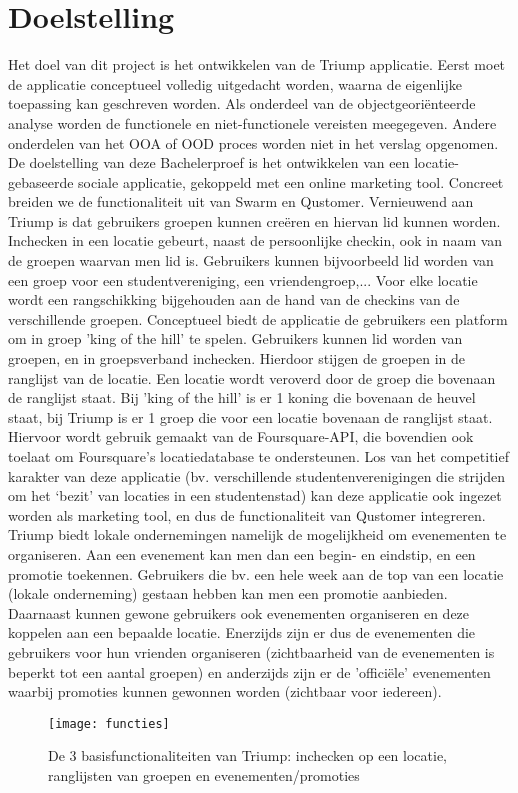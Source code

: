 
\chapter{Doelstelling}

Het doel van dit project is het ontwikkelen van de Triump applicatie. Eerst moet de applicatie conceptueel volledig uitgedacht worden, waarna de eigenlijke toepassing kan geschreven worden. Als onderdeel van de objectgeoriënteerde analyse worden de functionele en niet-functionele vereisten meegegeven. Andere onderdelen van het OOA of OOD proces worden niet in het verslag opgenomen.
De doelstelling van deze Bachelerproef is het ontwikkelen van een locatie-gebaseerde sociale applicatie, gekoppeld met een online marketing tool. Concreet breiden we de functionaliteit uit van Swarm en Qustomer. Vernieuwend aan Triump is dat gebruikers groepen kunnen creëren en hiervan lid kunnen worden. Inchecken in een locatie gebeurt, naast de persoonlijke checkin, ook in naam van de groepen waarvan men lid is. Gebruikers kunnen bijvoorbeeld lid worden van een groep voor een studentvereniging, een vriendengroep,...
Voor elke locatie wordt een rangschikking bijgehouden aan de hand van de checkins van de verschillende groepen. Conceptueel biedt de applicatie de gebruikers een platform om in groep 'king of the hill' te spelen. Gebruikers kunnen lid worden van groepen, en in groepsverband inchecken. Hierdoor stijgen de groepen in de ranglijst van de locatie. Een locatie wordt veroverd door de groep die bovenaan de ranglijst staat.
Bij 'king of the hill' is er 1 koning die bovenaan de heuvel staat, bij Triump is er 1 groep die voor een locatie bovenaan de ranglijst staat.
Hiervoor wordt gebruik gemaakt van de Foursquare-API, die bovendien ook toelaat om Foursquare's locatiedatabase te ondersteunen.
Los van het competitief karakter van deze applicatie (bv. verschillende studentenverenigingen die strijden om het ‘bezit’ van locaties in een studentenstad) kan deze applicatie ook ingezet worden als marketing tool, en dus de functionaliteit van Qustomer integreren.
Triump biedt lokale ondernemingen namelijk de mogelijkheid om evenementen te organiseren. Aan een evenement kan men dan een begin- en eindstip, en een promotie toekennen. Gebruikers die bv. een hele week aan de top van een locatie (lokale onderneming) gestaan hebben kan men een promotie aanbieden. Daarnaast kunnen gewone gebruikers ook evenementen organiseren en deze koppelen aan een bepaalde locatie.
Enerzijds zijn er dus de evenementen die gebruikers voor hun vrienden organiseren (zichtbaarheid van de evenementen is beperkt tot een aantal groepen) en anderzijds zijn er de 'officiële' evenementen waarbij promoties kunnen gewonnen worden (zichtbaar voor iedereen). 
\begin{figure}[H]
	\centering
	\texttt{[image: functies]}
	\label{fig:functions}
	\caption{De 3 basisfunctionaliteiten van Triump: inchecken op een locatie, \newline ranglijsten van groepen en evenementen/promoties}
\end{figure}
